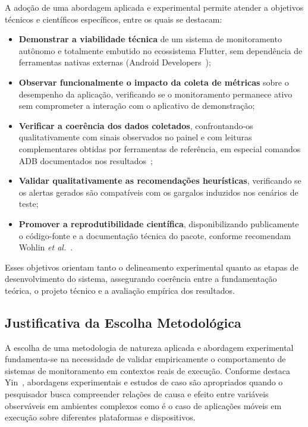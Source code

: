 A adoção de uma abordagem aplicada e experimental permite atender a objetivos técnicos e científicos específicos, entre os quais se destacam:

\begin{itemize}
  \item \textbf{Demonstrar a viabilidade técnica} de um sistema de monitoramento autônomo e totalmente embutido no ecossistema Flutter, sem dependência de ferramentas nativas externas (Android Developers~\cite{android2024});
  \item \textbf{Observar funcionalmente o impacto da coleta de métricas} sobre o desempenho da aplicação, verificando se o monitoramento permanece ativo sem comprometer a interação com o aplicativo de demonstração;
  \item \textbf{Verificar a coerência dos dados coletados}, confrontando-os qualitativamente com sinais observados no painel e com leituras complementares obtidas por ferramentas de referência, em especial comandos ADB documentados nos resultados~\cite{android2024};
  \item \textbf{Validar qualitativamente as recomendações heurísticas}, verificando se os alertas gerados são compatíveis com os gargalos induzidos nos cenários de teste;
  \item \textbf{Promover a reprodutibilidade científica}, disponibilizando publicamente o código-fonte e a documentação técnica do pacote, conforme recomendam Wohlin \textit{et al.}~\cite{wohlin2012}.
\end{itemize}

Esses objetivos orientam tanto o delineamento experimental quanto as etapas de desenvolvimento do sistema, assegurando coerência entre a fundamentação teórica, o projeto técnico e a avaliação empírica dos resultados.

\subsection{Justificativa da Escolha Metodológica}

A escolha de uma metodologia de natureza aplicada e abordagem experimental fundamenta-se na necessidade de validar empiricamente o comportamento de sistemas de monitoramento em contextos reais de execução.
Conforme destaca Yin~\cite{yin2015}, abordagens experimentais e estudos de caso são apropriados quando o pesquisador busca compreender relações de causa e efeito entre variáveis observáveis em ambientes complexos como é o caso de aplicações móveis em execução sobre diferentes plataformas e dispositivos.

